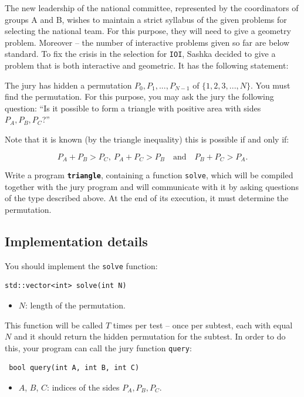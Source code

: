 \documentclass[12pt]{article}
\begin{document}
\renewcommand{\headerLang}{English}
\renewcommand{\problemName}{AB23. TRIANGLE}

\renewcommand{\headerLeft}{IATI Day 2, Senior group}
\renewcommand{\headerRightFirst}{XVII INTERNATIONAL ADVANCED TOURNAMENT IN INFORMATICS}
\renewcommand{\headerRightSecond}{ONLINE 2026}

\renewcommand{\tl}{$10$ sec.}
\renewcommand{\ml}{$1024$ MB}
\problem{Problem \problemName}

The new leadership of the national committee, represented by the coordinators of groups A and B, wishes to maintain a strict syllabus of the given problems for selecting the national team. For this purpose, they will need to give a geometry problem. Moreover -- the number of interactive problems given so far are below standard. To fix the crisis in the selection for \texttt{IOI}, Sashka decided to give a problem that is both interactive and geometric. It has the following statement:

The jury has hidden a permutation $P_0,P_1,...,P_{N-1}$ of $\{1,2,3,...,N\}$. You must find the permutation. For this purpose, you may ask the jury the following question: ``Is it possible to form a triangle with positive area with sides $P_A,P_B,P_C$?''

Note that it is known (by the triangle inequality) this is possible if and only if:

\[P_A + P_B > P_C,\ P_A + P_C > P_B \quad \text{and} \quad P_B + P_C > P_A.\]

Write a program \textbf{\texttt{triangle}}, containing a function \texttt{solve}, which will be compiled together with the jury program and will communicate with it by asking questions of the type described above. At the end of its execution, it must determine the permutation.

\subsection{Implementation details}
You should implement the \texttt{solve} function:
\begin{lstlisting}
std::vector<int> solve(int N)
\end{lstlisting}
\begin{itemize}
	\item $N$: length of the permutation.
\end{itemize}

This function will be called $T$ times per test -- once per subtest, each with equal $N$ and it should return the hidden permutation for the subtest. In order to do this, your program can call the jury function \texttt{query}:
\begin{lstlisting}
 bool query(int A, int B, int C)
\end{lstlisting}
\begin{itemize}
	\item $A$, $B$, $C$: indices of the sides $P_A, P_B, P_C$.
\end{itemize}
\end{document}
